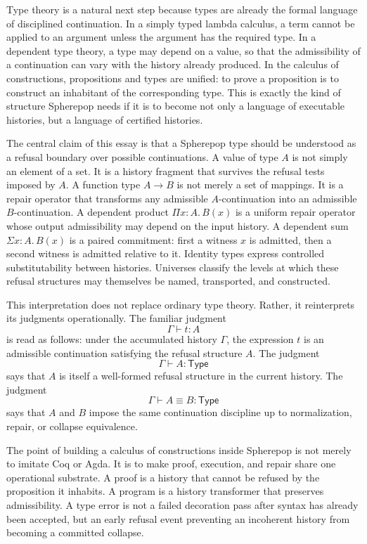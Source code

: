 \documentclass[12pt,oneside]{article}
\newcommand{\Type}{\mathsf{Type}}
\newcommand{\judges}{\vdash}
\newcommand{\defeq}{\equiv}
\begin{document}
Type theory is a natural next step because types are already the formal language of disciplined continuation. In a simply typed lambda calculus, a term cannot be applied to an argument unless the argument has the required type. In a dependent type theory, a type may depend on a value, so that the admissibility of a continuation can vary with the history already produced. In the calculus of constructions, propositions and types are unified: to prove a proposition is to construct an inhabitant of the corresponding type. This is exactly the kind of structure Spherepop needs if it is to become not only a language of executable histories, but a language of certified histories.

The central claim of this essay is that a Spherepop type should be understood as a refusal boundary over possible continuations. A value of type $A$ is not simply an element of a set. It is a history fragment that survives the refusal tests imposed by $A$. A function type $A \to B$ is not merely a set of mappings. It is a repair operator that transforms any admissible $A$-continuation into an admissible $B$-continuation. A dependent product $\Pi x:A.\,B(x)$ is a uniform repair operator whose output admissibility may depend on the input history. A dependent sum $\Sigma x:A.\,B(x)$ is a paired commitment: first a witness $x$ is admitted, then a second witness is admitted relative to it. Identity types express controlled substitutability between histories. Universes classify the levels at which these refusal structures may themselves be named, transported, and constructed.

This interpretation does not replace ordinary type theory. Rather, it reinterprets its judgments operationally. The familiar judgment
\[
\Gamma \judges t : A
\]
is read as follows: under the accumulated history $\Gamma$, the expression $t$ is an admissible continuation satisfying the refusal structure $A$. The judgment
\[
\Gamma \judges A : \Type
\]
says that $A$ is itself a well-formed refusal structure in the current history. The judgment
\[
\Gamma \judges A \defeq B : \Type
\]
says that $A$ and $B$ impose the same continuation discipline up to normalization, repair, or collapse equivalence.

The point of building a calculus of constructions inside Spherepop is not merely to imitate Coq or Agda. It is to make proof, execution, and repair share one operational substrate. A proof is a history that cannot be refused by the proposition it inhabits. A program is a history transformer that preserves admissibility. A type error is not a failed decoration pass after syntax has already been accepted, but an early refusal event preventing an incoherent history from becoming a committed collapse.
\end{document}
